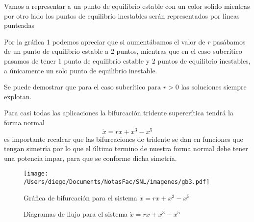 \begin{tcolorbox}[colback=Black!4,colframe=White] 
\begin{nota}
Vamos a representar a un punto de equilibrio estable con un color solido mientras por otro lado los puntos de equilibrio inestables serán representados por lineas punteadas
\end{nota}
\end{tcolorbox}

\begin{tcolorbox}[colback=Black!4,colframe=White] 
\begin{nota}
  Por la gráfica 1 podemos apreciar que si aumentábamos el valor de $r$ pasábamos de un punto de equilibrio estable a 2 puntos, mientras que en el caso subcrítico pasamos de tener 1 punto de equilibrio estable y 2 puntos de equilibrio inestables, a únicamente un solo punto de equilibrio inestable. 
\end{nota}
\end{tcolorbox}

\begin{tcolorbox}[colback=Black!4,colframe=White] 
\begin{nota}
Se puede demostrar que para el caso subcrítico para $r>0$ las soluciones siempre explotan.  
\end{nota}
\end{tcolorbox}



\begin{tcolorbox}[colback=Black!4,colframe=White] 
\begin{nota}
  Para casi todas las aplicaciones la bifurcación tridente supercrítica tendrá la forma normal $$
  \dot{{x}} {=rx+x^3-x^{5}}
  $$
  es importante recalcar que las bifurcaciones de tridente se dan en funciones que tengan simetría por lo que el último termino de nuestra forma normal debe tener una potencia impar, para que se conforme dicha simetría. 
\end{nota}
\end{tcolorbox}

\begin{figure}[htpb]
  \centering
  \texttt{[image: /Users/diego/Documents/NotasFac/SNL/imagenes/gb3.pdf]}
  \caption{Gráfica de bifurcación para el sistema $\dot{{x}} {=rx+x^3-x^{5}}
  $}
\end{figure}

\begin{figure}[H]
 \centering
    \vfill
    \caption{Diagramas de flujo para el sistema $\dot{x}=rx+x^3-x^{5}$}
\end{figure}

